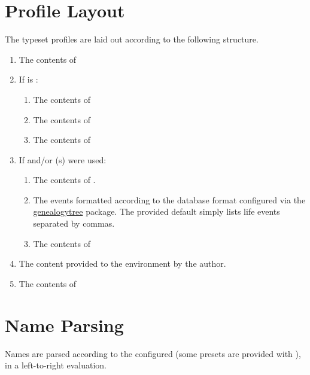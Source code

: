 \documentclass[
	a4paper,
]{article}
\begin{document}
\clearpage
\section{Profile Layout} %

\label{sec:structure}
The typeset profiles are laid out according to the following structure.

\begin{enumerate}

\item The contents of 

\item If  is :
	\begin{enumerate}
	\item The contents of 
	\item The contents of 
	\item The contents of 
	\end{enumerate}

\item If  and/or (s) were used:
	\begin{enumerate}
	\item The contents of .
	\item The events formatted according to the database format configured via the \href{https://ctan.org/pkg/genealogytree}{genealogytree} package. The provided default simply lists life events separated by commas.
	\item The contents of 
	\end{enumerate}

\item The content provided to the environment by the author.

\item The contents of 

\end{enumerate}


\section{Name Parsing} %

\label{sec:nameparsing}
Names are parsed according to the configured  (some presets are provided with ), in a left-to-right evaluation.
\end{document}
